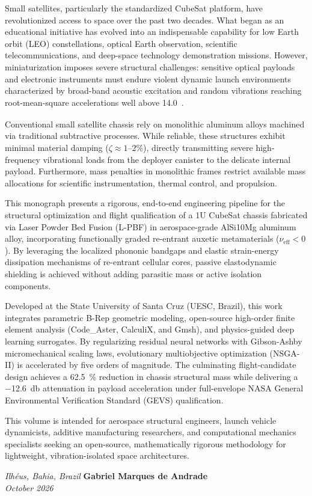 \preface

Small satellites, particularly the standardized CubeSat platform, have revolutionized access to space over the past two decades. What began as an educational initiative has evolved into an indispensable capability for low Earth orbit (LEO) constellations, optical Earth observation, scientific telecommunications, and deep-space technology demonstration missions. However, miniaturization imposes severe structural challenges: sensitive optical payloads and electronic instruments must endure violent dynamic launch environments characterized by broad-band acoustic excitation and random vibrations reaching root-mean-square accelerations well above \SI{14.0}{_{}}.

Conventional small satellite chassis rely on monolithic aluminum alloys machined via traditional subtractive processes. While reliable, these structures exhibit minimal material damping ($\zeta \approx 1\text{--}2\%$), directly transmitting severe high-frequency vibrational loads from the deployer canister to the delicate internal payload. Furthermore, mass penalties in monolithic frames restrict available mass allocations for scientific instrumentation, thermal control, and propulsion.

This monograph presents a rigorous, end-to-end engineering pipeline for the structural optimization and flight qualification of a 1U CubeSat chassis fabricated via Laser Powder Bed Fusion (L-PBF) in aerospace-grade AlSi10Mg aluminum alloy, incorporating functionally graded re-entrant auxetic metamaterials ($\nu_{\text{eff}} < 0$). By leveraging the localized phononic bandgaps and elastic strain-energy dissipation mechanisms of re-entrant cellular cores, passive elastodynamic shielding is achieved without adding parasitic mass or active isolation components.

Developed at the State University of Santa Cruz (UESC, Brazil), this work integrates parametric B-Rep geometric modeling, open-source high-order finite element analysis (Code\_Aster, CalculiX, and Gmsh), and physics-guided deep learning surrogates. By regularizing residual neural networks with Gibson-Ashby micromechanical scaling laws, evolutionary multiobjective optimization (NSGA-II) is accelerated by five orders of magnitude. The culminating flight-candidate design achieves a \SI{62.5}{\percent} reduction in chassis structural mass while delivering a \SI{-12.6}{\decibel} attenuation in payload acceleration under full-envelope NASA General Environmental Verification Standard (GEVS) qualification.

This volume is intended for aerospace structural engineers, launch vehicle dynamicists, additive manufacturing researchers, and computational mechanics specialists seeking an open-source, mathematically rigorous methodology for lightweight, vibration-isolated space architectures.

\vspace{\baselineskip}
\begin{flushright}
\textit{Ilhéus, Bahia, Brazil} \hfill \textbf{Gabriel Marques de Andrade}\\
\textit{October 2026} \hfill \\
\end{flushright}
